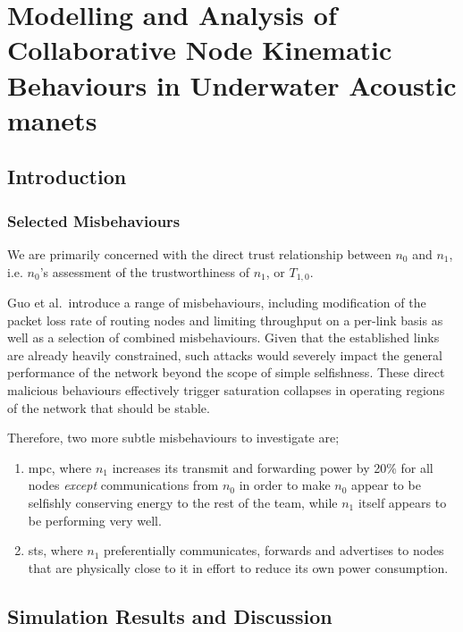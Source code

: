 \def\ChapterTitle{Modelling and Analysis of Collaborative Node Kinematic Behaviours in Underwater Acoustic \gls{manet}s}

\chapter{\ChapterTitle}
\label{Chapter\thechapter}

\section{Introduction}\label{sec:introduction}


\subsection{Selected Misbehaviours}

We are primarily concerned with the direct trust relationship between $n_0$ and $n_1$, i.e. $n_0$'s assessment of the trustworthiness of $n_1$, or $T_{1,0}$.

Guo et al.\ introduce a range of misbehaviours, including modification of the packet loss rate of routing nodes and limiting throughput on a per-link basis as well as a selection of combined misbehaviours. 
Given that the established links are already heavily constrained, such attacks would severely impact the general performance of the network beyond the scope of simple selfishness.
These direct malicious behaviours effectively trigger saturation collapses in operating regions of the network that should be stable.

Therefore, two more subtle misbehaviours to investigate are; 
\begin{enumerate}
	\item \acrfull{mpc}, where $n_1$ increases its transmit and forwarding power by 20\% for all nodes \emph{except} communications from $n_0$ in order to make $n_0$ appear to be selfishly conserving energy to the rest of the team, while $n_1$ itself appears to be performing very well.
	\item \acrfull{sts}, where $n_1$ preferentially communicates, forwards and advertises to nodes that are physically close to it in effort to reduce its own power consumption.
\end{enumerate}


\section{Simulation Results and Discussion}\label{sec:trustresultsanddiscussion}

